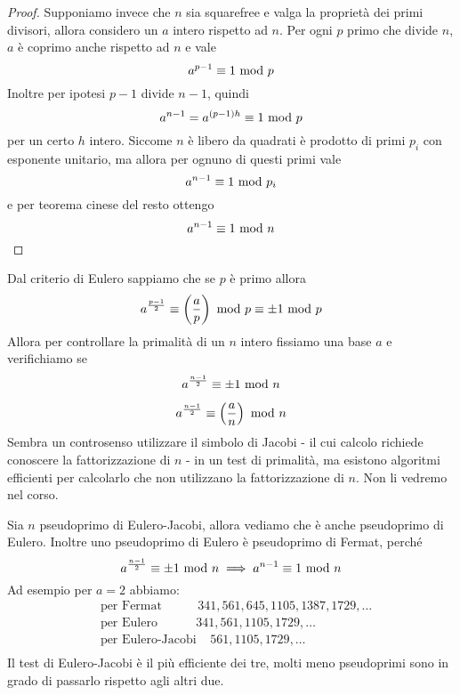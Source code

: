 \begin{proof}
	Supponiamo invece che $n$ sia squarefree e valga la proprietà dei primi divisori, allora considero un $a$ intero rispetto ad $n$. Per ogni $p$ primo che divide $n$, $a$ è coprimo anche rispetto ad $n$ e vale
	\begin{equation*}
	a^{p-1}\equiv1\ \mathrm{mod}\ p
	\end{equation*}
	Inoltre per ipotesi $p-1$ divide $n-1$, quindi 
	\begin{equation*}
	a^{n-1}=a^{(p-1)h}\equiv1\ \mathrm{mod}\ p
	\end{equation*}
	per un certo $h$ intero. Siccome $n$ è libero da quadrati è prodotto di primi $p_i$ con esponente unitario, ma allora per ognuno di questi primi vale 
	\begin{equation*}
	a^{n-1}\equiv1\ \mathrm{mod}\ p_i
	\end{equation*}
	e per teorema cinese del resto ottengo
	\begin{equation*}
	a^{n-1}\equiv1\ \mathrm{mod}\ n
	\end{equation*}
\end{proof}
\label{lezione10}
\begin{teorema}
	Dal criterio di Eulero sappiamo che se $p$ è primo allora 
	\begin{equation*}
	a^{\frac{p-1}{2}}\equiv\left(\frac{a}{p}\right)\ \mathrm{mod}\ p \equiv\pm1\ \mathrm{mod}\ p 
	\end{equation*}
	Allora per controllare la primalità di un $n$ intero fissiamo una base $a$ e verifichiamo se 
	\begin{equation*}
	a^{\frac{n-1}{2}}\equiv\pm1\ \mathrm{mod}\ n 
	\end{equation*}
\end{teorema}
\begin{teorema}
	\begin{equation*}
	a^{\frac{n-1}{2}}\equiv\left(\frac{a}{n}\right)\ \mathrm{mod}\ n
	\end{equation*}
	Sembra un controsenso utilizzare il simbolo di Jacobi - il cui calcolo richiede conoscere la fattorizzazione di $n$ - in un test di primalità, ma esistono algoritmi efficienti per calcolarlo che non utilizzano la fattorizzazione di $n$. Non li vedremo nel corso.
\end{teorema}
\begin{osservazione}
	Sia $n$ pseudoprimo di Eulero-Jacobi, allora vediamo che è anche pseudoprimo di Eulero. Inoltre uno pseudoprimo di Eulero è pseudoprimo di Fermat, perché
	\begin{equation*}
	a^{\frac{n-1}{2}} \equiv\pm1\ \mathrm{mod}\ n \implies a^{n-1} \equiv1\ \mathrm{mod}\ n
	\end{equation*}
	Ad esempio per $a=2$ abbiamo:
	\begin{align*}
	&\text{per Fermat} \ \ \ \ \ \ \ \ \ \ \ \ \ 341,561,645,1105,1387,1729,\dots\\
	&\text{per Eulero} \ \ \ \ \ \ \ \ \ \ \ \ \ \  341,561,1105,1729,\dots\\
	&\text{per Eulero-Jacobi} \ \ \ \ \ 561,1105,1729,\dots\\
	\end{align*}
	Il test di Eulero-Jacobi è il più efficiente dei tre, molti meno pseudoprimi sono in grado di passarlo rispetto agli altri due.
\end{osservazione}
